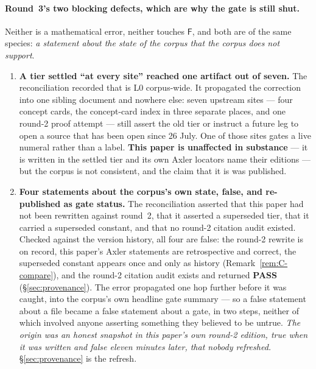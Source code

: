 \documentclass[11pt,a4paper]{article}
\theoremstyle{plain}
\theoremstyle{definition}
\theoremstyle{remark}
\newcommand{\Fb}{\mathsf{F}}
\begin{document}
\paragraph{Round~3's two blocking defects, which are why the gate is still shut.} Neither is a
mathematical error, neither touches $\Fb$, and both are of the same species: \emph{a statement
about the state of the corpus that the corpus does not support}.
\begin{enumerate}
\item \textbf{A tier settled ``at every site'' reached one artifact out of seven.} The
  reconciliation recorded that \cite{axler2014newbounds} is L0 corpus-wide. It propagated the
  correction into one sibling document and nowhere else: seven upstream sites --- four concept
  cards, the concept-card index in three separate places, and one round-2 proof attempt --- still
  assert the old tier or instruct a future leg to open a source that has been open since 26 July.
  One of those sites gates a live numeral rather than a label. \textbf{This paper is unaffected
  in substance} --- it is written in the settled tier and its own Axler locators name their
  editions --- but the corpus is not consistent, and the claim that it is was published.
\item \textbf{Four statements about the corpus's own state, false, and re-published as gate
  status.} The reconciliation asserted that this paper had not been rewritten against round~2,
  that it asserted a superseded tier, that it carried a superseded constant, and that no
  round-2 citation audit existed. Checked against the version history, all four are false: the
  round-2 rewrite is on record, this paper's Axler statements are retrospective and correct,
  the superseded constant appears once and only as history (Remark~\ref{rem:C-compare}), and
  the round-2 citation audit exists and returned \textbf{PASS} (\S\ref{sec:provenance}). The
  error propagated one hop further before it was caught, into the corpus's own headline gate
  summary --- so a false statement about a file became a false statement about a gate, in two
  steps, neither of which involved anyone asserting something they believed to be untrue.
  \emph{The origin was an honest snapshot in this paper's own round-2 edition, true when it was
  written and false eleven minutes later, that nobody refreshed.} \S\ref{sec:provenance} is the
  refresh.
\end{enumerate}
\end{document}
